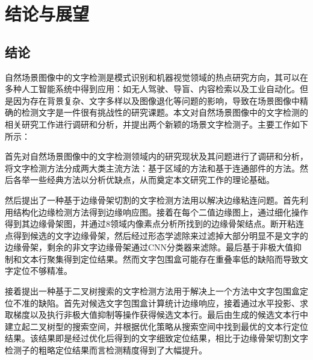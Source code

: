 ﻿%
%
%
%
%
%
\chapter{结论与展望}

    \section{结论}

    自然场景图像中的文字检测是模式识别和机器视觉领域的热点研究方向，其可以在多种人工智能系统中得到应用：如无人驾驶、导盲、内容检索以及工业自动化。但是因为存在背景复杂、文字多样以及图像退化等问题的影响，导致在场景图像中精确的检测文字是一件很有挑战性的研究课题。本文对自然场景图像中的文字检测的相关研究工作进行调研和分析，并提出两个新颖的场景文字检测子。主要工作如下所示：

    首先对自然场景图像中的文字检测领域内的研究现状及其问题进行了调研和分析，将文字检测方法分成两大类主流方法：基于区域的方法和基于连通部件的方法。然后各举一些经典方法以分析优缺点，从而奠定本文研究工作的理论基础。

    然后提出了一种基于边缘骨架切割的文字检测方法用以解决边缘粘连问题。首先利用结构化边缘检测方法得到边缘响应图。接着在每个二值边缘图上，通过细化操作得到其边缘骨架图，并通过8领域内像素点分析所找到的边缘骨架结点。断开粘连点得到候选的文字边缘骨架，然后经过形态学滤除来过滤掉大部分明显不是文字的边缘骨架，剩余的非文字边缘骨架通过CNN分类器来滤除。最后基于非极大值抑制和文本行聚集得到定位结果。然而文字包围盒可能存在重叠率低的缺陷而导致文字定位不够精准。

    接着提出一种基于二叉树搜索的文字检测方法用于解决上一个方法中文字包围盒定位不准的缺陷。首先对候选文字包围盒计算统计边缘响应，接着通过水平投影、求取梯度以及执行非极大值抑制等操作获得候选文本行。最后由生成的候选文本行中建立起二叉树型的搜索空间，并根据优化策略从搜索空间中找到最优的文本行定位结果。该结果即是经过优化后得到的文字细致定位结果，相比于边缘骨架切割文字检测子的粗略定位结果而言检测精度得到了大幅提升。

